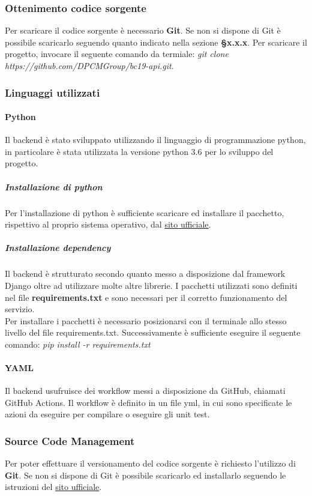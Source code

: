 \subsubsection{Ottenimento codice sorgente}
Per scaricare il codice sorgente è necessario \textbf{Git}. Se non si dispone di Git è possibile scaricarlo seguendo quanto indicato nella sezione \textbf{§x.x.x}. Per scaricare il progetto, invocare il seguente comando da termiale: \textit{git clone https://github.com/DPCMGroup/bc19-api.git}.

\subsubsection{Linguaggi utilizzati}
\paragraph{Python}
Il backend è stato sviluppato utilizzando il linguaggio di programmazione python, in particolare è stata utilizzata la versione python 3.6 per lo sviluppo del progetto.

\subparagraph{Installazione di python}
Per l'installazione di python è sufficiente scaricare ed installare il pacchetto, rispettivo al proprio sistema operativo, dal \href{https://www.python.org/downloads/}{sito ufficiale}.

\subparagraph{Installazione dependency}
Il backend è strutturato secondo quanto messo a disposizione dal framework Django oltre ad utilizzare molte altre librerie. I pacchetti utilizzati sono definiti nel file \textbf{requirements.txt} e sono necessari per il corretto funzionamento del servizio.\\
Per installare i pacchetti è necessario posizionarsi con il terminale allo stesso livello del file requirements.txt. Successivamente è sufficiente eseguire il seguente comando: \textit{pip install -r requirements.txt}

\paragraph{YAML}
Il backend usufruisce dei workflow messi a disposizione da GitHub, chiamati GitHub Actions. Il workflow è definito in un file yml, in cui sono specificate le azioni da eseguire per compilare o eseguire gli unit test.

\subsubsection{Source Code Management}
Per poter effettuare il versionamento del codice sorgente è richiesto l'utilizzo di \textbf{Git}. Se non si dispone di Git è possibile scaricarlo ed installarlo seguendo le istruzioni del \href{https://git-scm.com/downloads}{sito ufficiale}.

